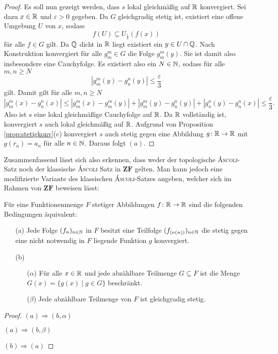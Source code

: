 \begin{proof}
  Es soll nun gezeigt werden, dass $s$ lokal gleichmäßig auf $\mathbb{R}$ konvergiert.
  Sei dazu $x \in \mathbb{R}$ und $\varepsilon > 0$ gegeben.
  Da $G$ gleichgradig stetig ist, existiert eine offene Umgebung $U$ von $x$, sodass
  \begin{displaymath}
    f(U) \subseteq U_\frac{\varepsilon}{3}(f(x))
  \end{displaymath}
  für alle $f \in G$ gilt.
  Da $\mathbb{Q}$ dicht in $\mathbb{R}$ liegt existiert ein $y \in U \cap \mathbb{Q}$.
  Nach Konstruktion konvergiert für alle $g_m^m \in G$ die Folge $g_m^m(y)$.
  Sie ist damit also insbesondere eine Cauchyfolge.
  Es existiert also ein $N \in \mathbb{N}$, sodass für alle $m,n \geq N$
  \begin{displaymath}
    | g_m^m(y) - g_n^n(y) | \leq \frac{\varepsilon}{3}
  \end{displaymath}
  gilt.
  Damit gilt für alle $m, n \geq N$
  \begin{displaymath}
    | g_m^m(x) - g_n^n(x) |
    \leq 
    | g_m^m(x) - g_m^m(y) | +  | g_m^m(y) - g_n^n(y) | +  | g_n^n(y) - g_n^n(x) |
    \leq
    \frac{\varepsilon}{3}.
  \end{displaymath}
  Also ist $s$ eine lokal gleichmäßige Cauchyfolge auf $\mathbb{R}$.
  Da $\mathbb{R}$ vollständig ist, konvergiert $s$ auch lokal gleichmäßig auf $\mathbb{R}$. 
  Aufgrund von Proposition \ref{prop:stetigkonv}(c) konvergiert $s$ auch stetig gegen eine Abbildung $g \colon \mathbb{R} \to \mathbb{R}$ mit $g(r_n) = a_n$ für alle $n \in \mathbb{N}$.
  Daraus folgt $(a)$.
\end{proof}

Zusammenfassend lässt sich also erkennen, dass weder der topologische \textsc{Áscoli}-Satz noch der klassische \textsc{Áscoli} Satz in $\mathbf{ZF}$ gelten. Man kann jedoch eine modifizierte Variante des klassischen \textsc{Áscoli}-Satzes angeben, welcher sich im Rahmen von $\mathbf{ZF}$ beweisen lässt:

\begin{thm}
  Für eine Funktionenmenge $F$ stetiger Abbildungen $f \colon \mathbb{R} \to \mathbb{R}$ sind die folgenden Bedingungen äquivalent:
  \begin{itemize}

    \item[(a)] Jede Folge $(f_n)_{n \in \mathbb{N}}$ in $F$ besitzt eine Teilfolge $(f_{(\nu(n))})_{n \in \mathbb{N}}$ die stetig gegen eine nicht notwendig in $F$ liegende Funktion $g$ konvergiert.

    \item[(b)]
      \begin{itemize}
        \item[($\alpha$)] Für alle $x \in \mathbb{R}$ und jede abzählbare Teilmenge $G \subseteq F$ ist die Menge $G(x) = \{ g(x) \mid g \in G \}$ beschränkt.
        \item[($\beta$)] Jede abzählbare Teilmenge von $F$ ist gleichgradig stetig.
      \end{itemize}
  \end{itemize}
\end{thm}

\begin{proof}
  $(a) \Rightarrow (b,\alpha)$

  $(a) \Rightarrow (b,\beta)$

  $(b) \Rightarrow (a)$
\end{proof}
